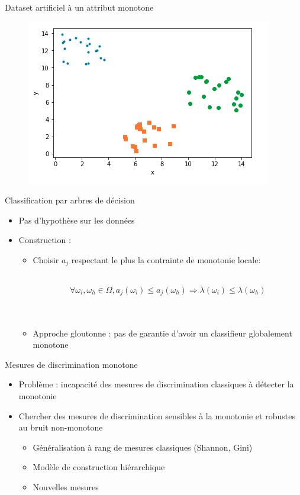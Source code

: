 \documentclass[usenames,dvipsnames]{beamer}
\begin{document}
\begin{frame}{Dataset artificiel à un attribut monotone}

\begin{figure}
	\includegraphics[width=.7\textwidth]{artificial-dataset.png}
\end{figure}

\end{frame}

\begin{frame}{Classification par arbres de décision}
\begin{itemize}
\item Pas d'hypothèse sur les données
\item Construction :
\begin{itemize}
\item Choisir $a_j$ respectant le plus la contrainte de monotonie locale: \\~\

$$\forall \omega_i, \omega_h \in \Omega, a_j(\omega_i) \leq a_j(\omega_h) \Rightarrow \lambda(\omega_i) \leq \lambda(\omega_h)$$ \\~\

\item Approche gloutonne : pas de garantie d'avoir un classifieur globalement monotone

\end{itemize}
\end{itemize}

\end{frame}

\begin{frame}{Mesures de discrimination monotone}
    \begin{itemize}
    \item Problème : incapacité des mesures de discrimination classiques à détecter la monotonie 
    \item Chercher des mesures de discrimination sensibles à la monotonie et robustes au bruit non-monotone
    \begin{itemize}
        \item Généralisation à rang de mesures classiques (Shannon, Gini)
        \item Modèle de construction hiérarchique
        \item Nouvelles mesures
    \end{itemize}
\end{itemize}
\end{frame}
\end{document}
